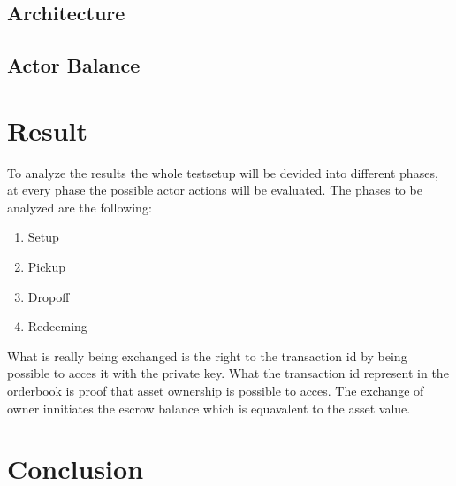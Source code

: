\documentclass[Nomencl]{DylanMaster}
\begin{document}
\subsection{Architecture}

\subsection{Actor Balance}


\section{Result}

To analyze the results the whole testsetup will be devided into different phases, at every phase the possible actor actions will be evaluated. The phases to be analyzed are the following:
\begin{enumerate}
  \item Setup
  \item Pickup
  \item Dropoff
  \item Redeeming
\end{enumerate}

What is really being exchanged is the right to the transaction id by being possible to acces it with the private key. What the transaction id represent in the orderbook is proof that asset ownership is possible to acces. The exchange of owner innitiates the escrow balance which is equavalent to the asset value.

\section{Conclusion}
\end{document}
